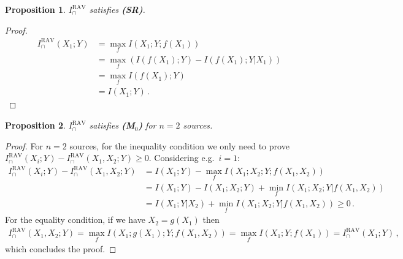 \documentclass{article}
\newcommand{\ts}[1]{\ensuremath{_{\text{#1}}}}
\newcommand{\SR}{\textbf{(SR)}\xspace} %
\newcommand{\Mz}{\textbf{(M\ts{0})}\xspace} %
\newcommand{\IRAV}{\ensuremath{I_\cap^{\text{RAV}}}\xspace}
\newtheorem{proposition}{Proposition}
\begin{document}
\begin{proposition} \label{prop:RAV-SR}
    $\IRAV$ satisfies \SR.
\end{proposition}
\begin{proof}
    \begin{equation}
        \begin{aligned}
            \IRAV(X_1;Y) & = \max_f I(X_1;Y;f(X_1)) \\
            & = \max_f \left( I(f(X_1);Y) - I(f(X_1);Y|X_1) \right) \\
            & = \max_f I(f(X_1);Y) \\
            & = I(X_1;Y) \,.
        \end{aligned}
    \end{equation}
\end{proof}

\begin{proposition} \label{prop:RAV-Mz}
    $\IRAV$ satisfies \Mz for $n=2$ sources.
\end{proposition}
\begin{proof}
    For $n=2$ sources, for the inequality condition we only need to prove $\IRAV(X_i;Y)-\IRAV(X_1,X_2;Y)\ge0$. Considering e.g.\ $i=1$:
    \begin{equation}
        \begin{aligned}
            \IRAV(X_i;Y)-\IRAV(X_1,X_2;Y) & = I(X_1;Y) - \max_f I(X_1;X_2;Y;f(X_1,X_2)) \\
            & = I(X_1;Y) - I(X_1;X_2;Y) + \min_f I(X_1;X_2;Y|f(X_1,X_2)) \\
            & = I(X_1;Y|X_2) + \min_f I(X_1;X_2;Y|f(X_1,X_2)) \ge 0 \,.
        \end{aligned}
    \end{equation}
    For the equality condition, if we have $X_2 = g(X_1)$ then 
    \begin{equation}
        \begin{aligned}
            \IRAV(X_1,X_2;Y) = \max_f I(X_1;g(X_1);Y;f(X_1,X_2)) = \max_f I(X_1;Y;f(X_1)) = \IRAV(X_1;Y) \,,
        \end{aligned}
    \end{equation}
    which concludes the proof.
\end{proof}
\end{document}

